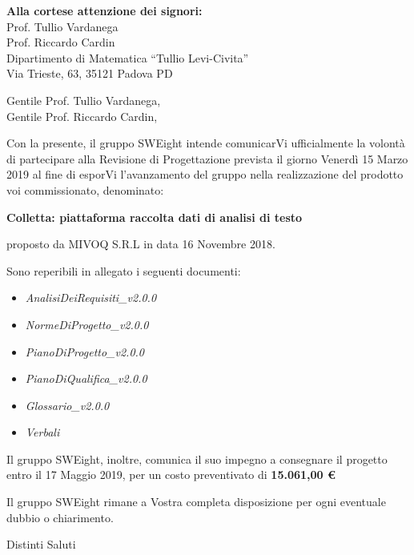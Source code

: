 \documentclass[11pt]{brownletter}
\date{Padova, 8 Marzo 2019} %
\newcommand{\AdR}{\emph{AnalisiDeiRequisiti\_v2.0.0}}
\newcommand{\NdP}{\emph{NormeDiProgetto\_v2.0.0}}
\newcommand{\PdP}{\emph{PianoDiProgetto\_v2.0.0}}
\newcommand{\PdQ}{\emph{PianoDiQualifica\_v2.0.0}}
\newcommand{\G}{\emph{Glossario\_v2.0.0}}
\begin{document}
\begin{letter}{\textbf{Alla cortese attenzione dei signori:}\\
	Prof. Tullio Vardanega\\
	Prof. Riccardo Cardin\\
	Dipartimento di Matematica “Tullio Levi-Civita”\\
	Via Trieste, 63, 35121 Padova PD}

\opening{	Gentile Prof. Tullio Vardanega,\\
			Gentile Prof. Riccardo Cardin,\\}

Con la presente, il gruppo SWEight intende comunicarVi ufficialmente la volontà di partecipare  alla Revisione di Progettazione prevista il giorno Venerdì 15 Marzo 2019 al fine di esporVi l’avanzamento del gruppo nella realizzazione del prodotto voi commissionato, denominato:
\begin{center}
	\textbf{Colletta: piattaforma raccolta dati di analisi di testo}
\end{center}
proposto da MIVOQ S.R.L in data 16 Novembre 2018.

Sono reperibili in allegato i seguenti documenti:
\begin{itemize}
	\item \AdR
	\item \NdP
	\item \PdP
	\item \PdQ
	\item \G
	\item \emph{Verbali}
\end{itemize}
Il gruppo SWEight, inoltre, comunica il suo impegno a consegnare il progetto entro il 17 Maggio 2019, per un costo preventivato di \textbf{15.061,00 \euro}

Il gruppo SWEight rimane a Vostra completa disposizione per ogni eventuale dubbio o chiarimento.
\closing{Distinti Saluti}

\end{letter}
\end{document}
